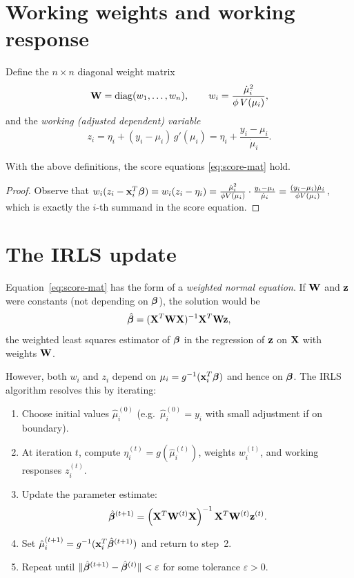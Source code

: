 \section*{Working weights and working response}

Define the $n\times n$ diagonal weight matrix
\[
  \mathbf{W} = \operatorname{diag}(w_1,\dots,w_n),
  \qquad
  w_i = \frac{\dot{\mu}_i^2}{\phi\,V(\mu_i)},
\]
and the \emph{working (adjusted dependent) variable}
\[
  z_i = \eta_i + (y_i - \mu_i)\,g'(\mu_i)
       = \eta_i + \frac{y_i - \mu_i}{\dot{\mu}_i}.
\]

\begin{lemma}
  With the above definitions, the score equations
  \eqref{eq:score-mat} hold.
\end{lemma}

\begin{proof}
  Observe that
  $w_i(z_i - \mathbf{x}_i^T\boldsymbol{\beta}) = w_i(z_i - \eta_i)
   = \frac{\dot\mu_i^2}{\phi V(\mu_i)}\cdot\frac{y_i-\mu_i}{\dot\mu_i}
   = \frac{(y_i-\mu_i)\dot\mu_i}{\phi V(\mu_i)}$,
  which is exactly the $i$-th summand in the score equation.
\end{proof}

\section*{The IRLS update}

Equation~\eqref{eq:score-mat} has the form of a \emph{weighted normal
equation}.  If $\mathbf{W}$ and $\mathbf{z}$ were constants (not depending on
$\boldsymbol{\beta}$), the solution would be
\[
  \hat{\boldsymbol{\beta}} = (\mathbf{X}^T\mathbf{W}\mathbf{X})^{-1}\mathbf{X}^T\mathbf{W}\mathbf{z},
\]
the weighted least squares estimator of $\boldsymbol{\beta}$ in the regression of
$\mathbf{z}$ on $\mathbf{X}$ with weights $\mathbf{W}$.

However, both $w_i$ and $z_i$ depend on $\mu_i = g^{-1}(\mathbf{x}_i^T\boldsymbol{\beta})$
and hence on $\boldsymbol{\beta}$.  The IRLS algorithm resolves this by iterating:

\begin{enumerate}
  \item Choose initial values $\hat\mu_i^{(0)}$ (e.g.\ $\hat\mu_i^{(0)}=y_i$ with small adjustment if on boundary).
  \item At iteration $t$, compute $\eta_i^{(t)} = g(\hat\mu_i^{(t)})$,
        weights $w_i^{(t)}$, and working responses $z_i^{(t)}$.
  \item Update the parameter estimate:
        \[
          \hat{\boldsymbol{\beta}}^{(t+1)}
          = \left(\mathbf{X}^T\mathbf{W}^{(t)}\mathbf{X}\right)^{-1}\mathbf{X}^T\mathbf{W}^{(t)}\mathbf{z}^{(t)}.
        \]
  \item Set $\hat\mu_i^{(t+1)} = g^{-1}(\mathbf{x}_i^T\hat{\boldsymbol{\beta}}^{(t+1)})$ and
        return to step~2.
  \item Repeat until $\|\hat{\boldsymbol{\beta}}^{(t+1)}-\hat{\boldsymbol{\beta}}^{(t)}\| < \varepsilon$
        for some tolerance $\varepsilon > 0$.
\end{enumerate}

